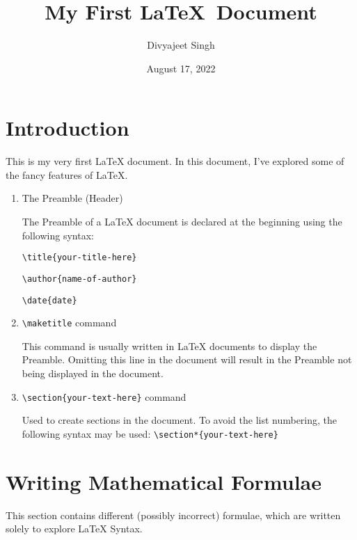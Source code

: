\documentclass{article}
\title{My First \LaTeX \ Document}
\author{Divyajeet Singh}
\date{August 17, 2022}
\begin{document}
\maketitle

\section{Introduction}

This is my very first LaTeX document. In this document, I've explored some of the fancy features of LaTeX.

\begin{enumerate}
    \item The Preamble (Header)

    The Preamble of a LaTeX document is declared at the beginning using the following syntax:

    \verb|\title{your-title-here}|

    \verb|\author{name-of-author}|

    \verb|\date{date}|

    \item \verb|\maketitle| command

    This command is usually written in LaTeX documents to display the Preamble. Omitting this line in the document will result in the Preamble not being displayed in the document.

    \item \verb|\section{your-text-here}| command

    Used to create sections in the document. To avoid the list numbering, the following syntax may be used: \verb|\section*{your-text-here}|

\end{enumerate}

\section{Writing Mathematical Formulae}

This section contains different (possibly incorrect) formulae, which are written solely to explore LaTeX Syntax.
\end{document}
